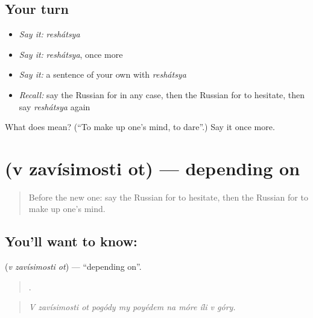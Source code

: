\subsection*{Your turn}
\begin{itemize}
\raggedright
  \item \emph{Say it:} \emph{reshátsya}
  \item \emph{Say it:} \emph{reshátsya}, once more
  \item \emph{Say it:} a sentence of your own with \emph{reshátsya}
  \item \emph{Recall:} say the Russian for in any case, then the Russian for to hesitate, then say \emph{reshátsya} again
\end{itemize}

\begin{tcolorbox}[breakable,colback=teal!4,colframe=teal!35!black,title={Before you move on}]
What does  mean? (\textquotedblleft{}To make up one’s mind, to dare\textquotedblright{}.) Say it once more.
\end{tcolorbox}
\section[\texorpdfstring{\ru{в} \ru{зависимости} \ru{от} (v zavísimosti ot)}{в зависимости от (v zavísimosti ot)}]{   (v zavísimosti ot) — depending on}

\label{lesson:RU-C379-v-zavisimosti-ot}



\begin{quote}
Before the new one: say the Russian for to hesitate, then the Russian for to make up one’s mind.
\end{quote}

\subsection*{You'll want to know:   }
\textbf{  } (\emph{v zavísimosti ot}) — \textquotedblleft{}depending on\textquotedblright{}.

\begin{quote}
          .
\end{quote}

\begin{quote}
\emph{V zavísimosti ot pogódy my poyédem na móre íli v góry.}
\end{quote}

